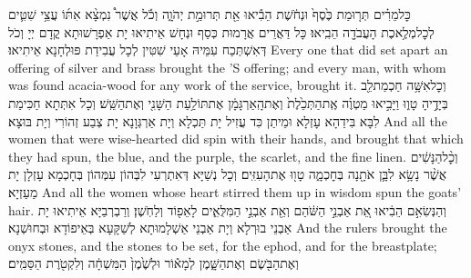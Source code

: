 {כׇּל\maqqaf מֵרִ֗ים תְּר֤וּמַת כֶּ֙סֶף֙ וּנְחֹ֔שֶׁת הֵבִ֕יאוּ אֵ֖ת תְּרוּמַ֣ת יְהֹוָ֑ה וְכֹ֡ל אֲשֶׁר֩ נִמְצָ֨א אִתּ֜וֹ עֲצֵ֥י שִׁטִּ֛ים לְכׇל\maqqaf מְלֶ֥אכֶת הָעֲבֹדָ֖ה הֵבִֽיאוּ׃}
{כָּל דַּאֲרֵים אֲרָמוּת כְּסַף וּנְחָשׁ אֵיתִיאוּ יָת אַפְרָשׁוּתָא קֳדָם יְיָ וְכֹל דְּאִשְׁתְּכַח עִמֵּיהּ אָעֵי שִׁטִּין לְכָל עֲבִידַת פּוּלְחָנָא אֵיתִיאוּ׃}
{Every one that did set apart an offering of silver and brass brought the \lord’S offering; and every man, with whom was found acacia-wood for any work of the service, brought it.}{}
{וְכׇל\maqqaf אִשָּׁ֥ה חַכְמַת\maqqaf לֵ֖ב בְּיָדֶ֣יהָ טָו֑וּ וַיָּבִ֣יאוּ מַטְוֶ֗ה אֶֽת\maqqaf הַתְּכֵ֙לֶת֙ וְאֶת\maqqaf הָֽאַרְגָּמָ֔ן אֶת\maqqaf תּוֹלַ֥עַת הַשָּׁנִ֖י וְאֶת\maqqaf הַשֵּֽׁשׁ׃}
{וְכָל אִתְּתָא חַכִּימַת לִבָּא בִּידַהָא עָזְלָא וּמֵיתַן כִּד עֲזִיל יָת תַּכְלָא וְיָת אַרְגְּוָנָא יָת צְבַע זְהוֹרִי וְיָת בּוּצָא׃}
{And all the women that were wise-hearted did spin with their hands, and brought that which they had spun, the blue, and the purple, the scarlet, and the fine linen.}{}
{וְכׇ֨ל\maqqaf הַנָּשִׁ֔ים אֲשֶׁ֨ר נָשָׂ֥א לִבָּ֛ן אֹתָ֖נָה בְּחׇכְמָ֑ה טָו֖וּ אֶת\maqqaf הָעִזִּֽים׃}
{וְכָל נְשַׁיָּא דְּאִתְרְעִי לִבְּהוֹן עִמְּהוֹן בְּחָכְמָא עָזְלָן יָת מַעַזְיָא׃}
{And all the women whose heart stirred them up in wisdom spun the goats’ hair.}{}
{וְהַנְּשִׂאִ֣ם הֵבִ֔יאוּ אֵ֚ת אַבְנֵ֣י הַשֹּׁ֔הַם וְאֵ֖ת אַבְנֵ֣י הַמִּלֻּאִ֑ים לָאֵפ֖וֹד וְלַחֹֽשֶׁן׃}
{וְרַבְרְבַיָּא אֵיתִיאוּ יָת אַבְנֵי בוּרְלָא וְיָת אַבְנֵי אַשְׁלָמוּתָא לְשַׁקָּעָא בְּאֵיפוֹדָא וּבְחוּשְׁנָא׃}
{And the rulers brought the onyx stones, and the stones to be set, for the ephod, and for the breastplate;}{}
{וְאֶת\maqqaf הַבֹּ֖שֶׂם וְאֶת\maqqaf הַשָּׁ֑מֶן לְמָא֕וֹר וּלְשֶׁ֙מֶן֙ הַמִּשְׁחָ֔ה וְלִקְטֹ֖רֶת הַסַּמִּֽים׃}
